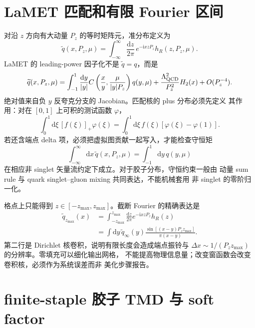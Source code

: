 \documentclass[UTF8,11pt,oneside]{ctexbook}
\newcommand{\dd}{\mathrm{d}}
\begin{document}
\section{LaMET 匹配和有限 Fourier 区间}

对沿 \(z\) 方向有大动量 \(P_z\) 的等时矩阵元，准分布定义为
\begin{equation}
 \widetilde q(x,P_z,\mu)=\int_{-\infty}^{\infty}
 \frac{\dd z}{2\pi}\,e^{-\mathrm{i}xzP_z}h_R(z,P_z,\mu).
 \label{eq:deep-quasi-fourier}
\end{equation}
LaMET 的 leading-power 因子化不是 \(\widetilde q=q\)，而是
\begin{equation}
 \widetilde q(x,P_z,\mu)=\int_{-1}^{1}\frac{\dd y}{|y|}
 C\left(\frac{x}{y},\frac{\mu}{|y|P_z}\right)q(y,\mu)
 +\frac{\Lambda_{\rm QCD}^2}{P_z^2}H_2(x)+O(P_z^{-4}).
 \label{eq:deep-lamet-factorization}
\end{equation}
绝对值来自负 \(y\) 反夸克分支的 Jacobian。匹配核的 plus 分布必须先定义
其作用：对在 \([0,1]\) 上可积的测试函数 \(\varphi\)，
\begin{equation}
 \int_0^1\dd\xi\,[f(\xi)]_+\varphi(\xi)
 =\int_0^1\dd\xi\,f(\xi)[\varphi(\xi)-\varphi(1)].
 \label{eq:deep-plus-definition}
\end{equation}
若还含端点 delta 项，必须把虚拟图贡献一起写入，才能检查守恒矩
\begin{equation}
 \int_{-\infty}^{\infty}\dd x\,\widetilde q(x,P_z,\mu)
 =\int_{-1}^{1}\dd y\,q(y,\mu)
 \label{eq:deep-number-sum-rule}
\end{equation}
在相应非 singlet 矢量流约定下成立。对于胶子分布，守恒约束一般由
动量 sum rule 与 quark singlet--gluon mixing 共同表达，不能机械套用
非 singlet 的零阶归一化。

格点上只能得到 \(z\in[-z_{\max},z_{\max}]\)。截断 Fourier 的精确表达是
\begin{align}
 \widetilde q_{z_{\max}}(x)
 &=\int_{-z_{\max}}^{z_{\max}}\frac{\dd z}{2\pi}
 e^{-\mathrm{i}xzP_z}h_R(z)\\
 &=\int\dd y\,\widetilde q_\infty(y)
 \frac{\sin[(x-y)P_zz_{\max}]}{\pi(x-y)}.
 \label{eq:deep-truncated-fourier-kernel}
\end{align}
第二行是 Dirichlet 核卷积，说明有限长度会造成端点振铃与
\(\Delta x\sim1/(P_zz_{\max})\) 的分辨率。零填充可以细化输出网格，
不能提高物理信息量；改变窗函数会改变卷积核，必须作为系统误差而非
美化步骤报告。

\section{finite-staple 胶子 TMD 与 soft factor}
\end{document}
